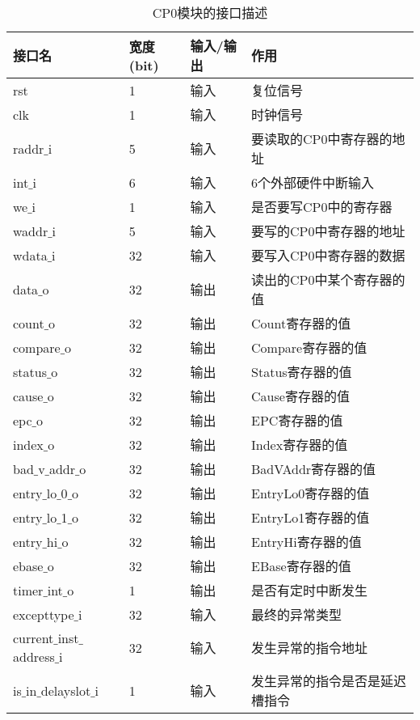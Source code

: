 \quad
\begin{table}[H]
	\centering
	\caption{CP0模块的接口描述}
	\begin{tabular}{|l|l|l|l|}
		\hline
		接口名 & 宽度(bit) & 输入/输出 & 作用 \\
		\hline
		rst & 1 & 输入 & 复位信号 \\
		\hline
		clk & 1 & 输入 & 时钟信号 \\
		\hline
		raddr$\_$i & 5 & 输入 & 要读取的CP0中寄存器的地址 \\
		\hline
		int$\_$i & 6 & 输入 & 6个外部硬件中断输入 \\
		\hline
		we$\_$i & 1 & 输入 & 是否要写CP0中的寄存器 \\
		\hline
		waddr$\_$i & 5 & 输入 & 要写的CP0中寄存器的地址 \\
		\hline
		wdata$\_$i & 32 & 输入 & 要写入CP0中寄存器的数据 \\
		\hline
		data$\_$o & 32 & 输出 & 读出的CP0中某个寄存器的值 \\
		\hline
		count$\_$o & 32 & 输出 & Count寄存器的值 \\
		\hline
		compare$\_$o & 32 & 输出 & Compare寄存器的值 \\
		\hline
		status$\_$o & 32 & 输出 & Status寄存器的值 \\
		\hline
		cause$\_$o & 32 & 输出 & Cause寄存器的值 \\
		\hline
		epc$\_$o & 32 & 输出 & EPC寄存器的值 \\
		\hline
		index$\_$o & 32 & 输出 & Index寄存器的值 \\
		\hline
		bad$\_$v$\_$addr$\_$o & 32 & 输出 & BadVAddr寄存器的值 \\
		\hline
		entry$\_$lo$\_$0$\_$o & 32 & 输出 & EntryLo0寄存器的值 \\
		\hline
		entry$\_$lo$\_$1$\_$o & 32 & 输出 & EntryLo1寄存器的值 \\
		\hline
		entry$\_$hi$\_$o & 32 & 输出 & EntryHi寄存器的值 \\
		\hline
		ebase$\_$o & 32 & 输出 & EBase寄存器的值 \\
		\hline
		timer$\_$int$\_$o & 1 & 输出 & 是否有定时中断发生 \\
		\hline
		excepttype$\_$i & 32 & 输入 & 最终的异常类型 \\
		\hline
		current$\_$inst$\_$address$\_$i & 32 & 输入 & 发生异常的指令地址 \\
		\hline
		is$\_$in$\_$delayslot$\_$i & 1 & 输入 & 发生异常的指令是否是延迟槽指令 \\
		\hline
	\end{tabular}
\end{table}
